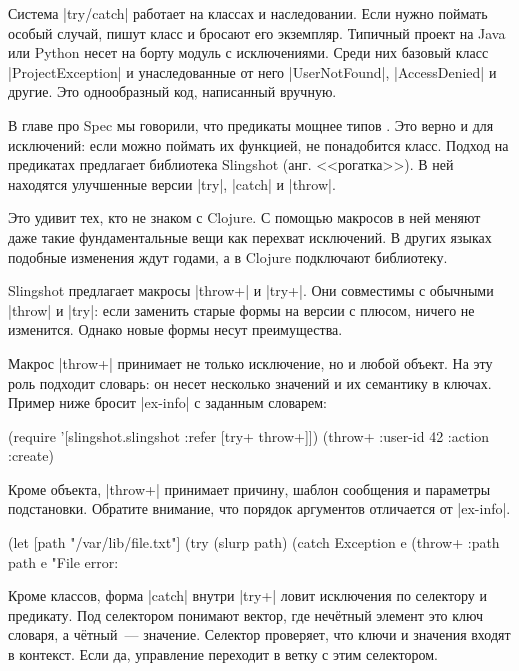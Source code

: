 Система \spverb|try/catch| работает на классах и наследовании. Если нужно
поймать особый случай, пишут класс и бросают его экземпляр. Типичный проект на
Java или Python несет на борту модуль с исключениями. Среди них базовый класс
\spverb|ProjectException| и унаследованные от него \spverb|UserNotFound|,
\spverb|AccessDenied| и другие. Это однообразный код, написанный вручную.

В главе про Spec мы говорили, что предикаты мощнее типов
. Это верно и для исключений: если можно поймать их
функцией, не понадобится класс. Подход на предикатах предлагает библиотека
Slingshot (анг. <<рогатка>>). В
ней находятся улучшенные версии \spverb|try|, \spverb|catch| и \spverb|throw|.

Это удивит тех, кто не знаком с Clojure. С помощью макросов в ней меняют даже
такие фундаментальные вещи как перехват исключений. В других языках подобные
изменения ждут годами, а в Clojure подключают библиотеку.

Slingshot предлагает макросы \spverb|throw+| и \spverb|try+|. Они совместимы с
обычными \spverb|throw| и \spverb|try|: если заменить старые формы на версии с
плюсом, ничего не изменится. Однако новые формы несут преимущества.

Макрос \spverb|throw+| принимает не только исключение, но и любой объект. На эту
роль подходит словарь: он несет несколько значений и их семантику в
ключах. Пример ниже бросит \spverb|ex-info| с заданным словарем:

\begin{english}
  \begin{clojure}
(require '[slingshot.slingshot :refer [try+ throw+]])
(throw+ {:user-id 42 :action :create})
  \end{clojure}
\end{english}

Кроме объекта, \spverb|throw+| принимает причину, шаблон сообщения и параметры
подстановки. Обратите внимание, что порядок аргументов отличается от
\spverb|ex-info|.

\begin{english}
  \begin{clojure}
(let [path "/var/lib/file.txt"]
  (try
    (slurp path)
    (catch Exception e
      (throw+ {:path path} e "File error: %
  \end{clojure}
\end{english}

Кроме классов, форма \spverb|catch| внутри \spverb|try+| ловит исключения по
селектору и предикату. Под селектором понимают вектор, где неч\"{е}тный элемент это
ключ словаря, а ч\"{е}тный~--- значение. Селектор проверяет, что ключи и значения
входят в контекст. Если да, управление переходит в ветку с этим селектором.


